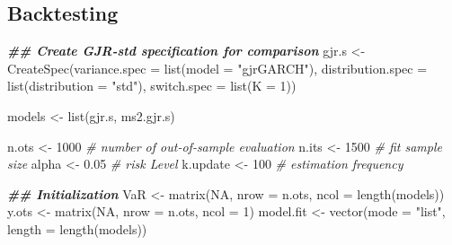 \documentclass[
]{article}
\newenvironment{Shaded}{\begin{snugshade}}{\end{snugshade}}
\newcommand{\AttributeTok}[1]{\textcolor[rgb]{0.77,0.63,0.00}{#1}}
\newcommand{\CommentTok}[1]{\textcolor[rgb]{0.56,0.35,0.01}{\textit{#1}}}
\newcommand{\ConstantTok}[1]{\textcolor[rgb]{0.00,0.00,0.00}{#1}}
\newcommand{\DecValTok}[1]{\textcolor[rgb]{0.00,0.00,0.81}{#1}}
\newcommand{\DocumentationTok}[1]{\textcolor[rgb]{0.56,0.35,0.01}{\textbf{\textit{#1}}}}
\newcommand{\FloatTok}[1]{\textcolor[rgb]{0.00,0.00,0.81}{#1}}
\newcommand{\FunctionTok}[1]{\textcolor[rgb]{0.00,0.00,0.00}{#1}}
\newcommand{\NormalTok}[1]{#1}
\newcommand{\OtherTok}[1]{\textcolor[rgb]{0.56,0.35,0.01}{#1}}
\newcommand{\StringTok}[1]{\textcolor[rgb]{0.31,0.60,0.02}{#1}}
\begin{document}
\hypertarget{backtesting}{%
\subsection{Backtesting}\label{backtesting}}

\begin{Shaded}
\begin{Highlighting}[]
\DocumentationTok{\#\# Create GJR{-}std specification for comparison}
\NormalTok{gjr.s }\OtherTok{\textless{}{-}} \FunctionTok{CreateSpec}\NormalTok{(}\AttributeTok{variance.spec =} \FunctionTok{list}\NormalTok{(}\AttributeTok{model =} \StringTok{"gjrGARCH"}\NormalTok{),}
                    \AttributeTok{distribution.spec =} \FunctionTok{list}\NormalTok{(}\AttributeTok{distribution =} \StringTok{"std"}\NormalTok{),}
                    \AttributeTok{switch.spec =} \FunctionTok{list}\NormalTok{(}\AttributeTok{K =} \DecValTok{1}\NormalTok{))}

\NormalTok{models }\OtherTok{\textless{}{-}} \FunctionTok{list}\NormalTok{(gjr.s, ms2.gjr.s)}

\NormalTok{n.ots    }\OtherTok{\textless{}{-}} \DecValTok{1000} \CommentTok{\# number of out{-}of{-}sample evaluation}
\NormalTok{n.its    }\OtherTok{\textless{}{-}} \DecValTok{1500} \CommentTok{\# fit sample size}
\NormalTok{alpha    }\OtherTok{\textless{}{-}} \FloatTok{0.05} \CommentTok{\# risk Level}
\NormalTok{k.update }\OtherTok{\textless{}{-}} \DecValTok{100}  \CommentTok{\# estimation frequency}
\end{Highlighting}
\end{Shaded}

\begin{Shaded}
\begin{Highlighting}[]
\DocumentationTok{\#\# Initialization}
\NormalTok{VaR   }\OtherTok{\textless{}{-}} \FunctionTok{matrix}\NormalTok{(}\ConstantTok{NA}\NormalTok{, }\AttributeTok{nrow =}\NormalTok{ n.ots, }\AttributeTok{ncol =} \FunctionTok{length}\NormalTok{(models))}
\NormalTok{y.ots }\OtherTok{\textless{}{-}} \FunctionTok{matrix}\NormalTok{(}\ConstantTok{NA}\NormalTok{, }\AttributeTok{nrow =}\NormalTok{ n.ots, }\AttributeTok{ncol =} \DecValTok{1}\NormalTok{)}
\NormalTok{model.fit }\OtherTok{\textless{}{-}} \FunctionTok{vector}\NormalTok{(}\AttributeTok{mode =} \StringTok{"list"}\NormalTok{, }\AttributeTok{length =} \FunctionTok{length}\NormalTok{(models))}
\end{Highlighting}
\end{Shaded}
\end{document}
